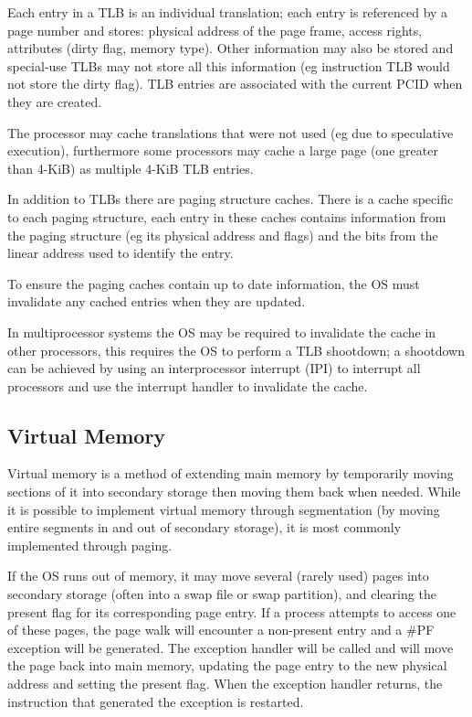 \documentclass{article}
\newcommand{\layout}[1]{\parbox{\linewidth}{#1}}
\begin{document}
\layout{
  Each entry in a TLB is an individual translation;
  each entry is referenced by a page number and stores: physical address of the page frame, access rights, attributes (dirty flag, memory type).
  Other information may also be stored and special-use TLBs may not store all this information (eg instruction TLB would not store the dirty flag).
  TLB entries are associated with the current PCID when they are created.
  \cite[Chapter~5.10.2.2]{sdm3}
} \bigskip

\layout{
  The processor may cache translations that were not used (eg due to speculative execution),
  furthermore some processors may cache a large page (one greater than 4-KiB) as multiple 4-KiB TLB entries.
  \cite[Chapter~5.10.2.3]{sdm3}
} \bigskip

\layout{
  In addition to TLBs there are paging structure caches.
  There is a cache specific to each paging structure, each entry in these caches contains information from the paging structure (eg its physical address and flags) and the bits from the linear address used to identify the entry.
  \cite[Chapter~5.10.3]{sdm3}
} \bigskip

\layout{
  To ensure the paging caches contain up to date information, the OS must invalidate any cached entries when they are updated.
  \cite[Chapter~5.10.4]{sdm3}
} \bigskip

\layout{
  In multiprocessor systems the OS may be required to invalidate the cache in other processors, this requires the OS to perform a TLB shootdown; a shootdown can be achieved by using an interprocessor interrupt (IPI) to interrupt all processors and use the interrupt handler to invalidate the cache.
  \cite[Chapter~5.10.5]{sdm3}
}

\layout{
  \subsection{Virtual Memory}

  Virtual memory is a method of extending main memory by temporarily moving sections of it into secondary storage then moving them back when needed.
  While it is possible to implement virtual memory through segmentation (by moving entire segments in and out of secondary storage), it is most commonly implemented through paging.
} \bigskip

\layout{
  If the OS runs out of memory, it may move several (rarely used) pages into secondary storage (often into a swap file or swap partition), and clearing the present flag for its corresponding page entry.
  If a process attempts to access one of these pages, the page walk will encounter a non-present entry and a \#PF exception will be generated.
  The exception handler will be called and will move the page back into main memory, updating the page entry to the new physical address and setting the present flag.
  When the exception handler returns, the instruction that generated the exception is restarted.

  \bigskip \cite[Chapter~5.12]{sdm3}
}
\end{document}

